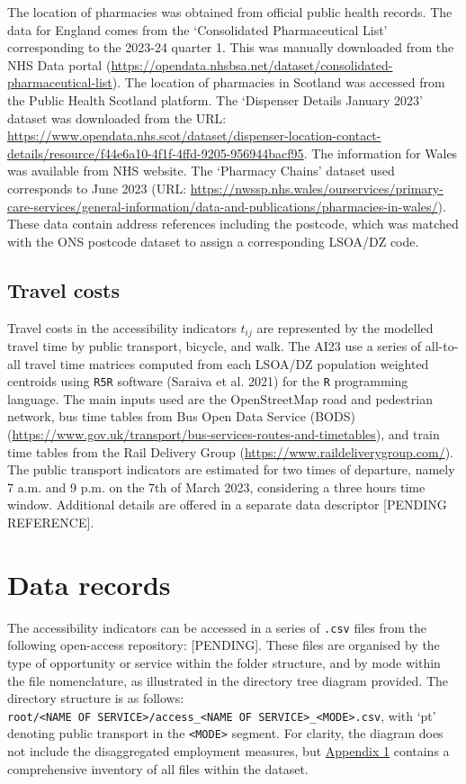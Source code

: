 \documentclass{article}
\begin{document}
The location of pharmacies was obtained from official public health
records. The data for England comes from the `Consolidated
Pharmaceutical List' corresponding to the 2023-24 quarter 1. This was
manually downloaded from the NHS Data portal
(\url{https://opendata.nhsbsa.net/dataset/consolidated-pharmaceutical-list}).
The location of pharmacies in Scotland was accessed from the Public
Health Scotland platform. The `Dispenser Details January 2023' dataset
was downloaded from the URL:
\url{https://www.opendata.nhs.scot/dataset/dispenser-location-contact-details/resource/f44e6a10-4f1f-4ffd-9205-956944bacf95}.
The information for Wales was available from NHS website. The `Pharmacy
Chains' dataset used corresponds to June 2023 (URL:
\url{https://nwssp.nhs.wales/ourservices/primary-care-services/general-information/data-and-publications/pharmacies-in-wales/}).
These data contain address references including the postcode, which was
matched with the ONS postcode dataset to assign a corresponding LSOA/DZ
code.

\hypertarget{travel-costs}{%
\subsection{Travel costs}\label{travel-costs}}

Travel costs in the accessibility indicators \(t_{ij}\) are represented
by the modelled travel time by public transport, bicycle, and walk. The
AI23 use a series of all-to-all travel time matrices computed from each
LSOA/DZ population weighted centroids using \texttt{R5R} software
(Saraiva et al. 2021) for the \texttt{R} programming language. The main
inputs used are the OpenStreetMap road and pedestrian network, bus time
tables from Bus Open Data Service (BODS)
(\url{https://www.gov.uk/transport/bus-services-routes-and-timetables}),
and train time tables from the Rail Delivery Group
(\url{https://www.raildeliverygroup.com/}). The public transport
indicators are estimated for two times of departure, namely 7 a.m. and 9
p.m. on the 7th of March 2023, considering a three hours time window.
Additional details are offered in a separate data descriptor {[}PENDING
REFERENCE{]}.

\hypertarget{data-records}{%
\section{Data records}\label{data-records}}

The accessibility indicators can be accessed in a series of
\texttt{.csv} files from the following open-access repository:
{[}PENDING{]}. These files are organised by the type of opportunity or
service within the folder structure, and by mode within the file
nomenclature, as illustrated in the directory tree diagram provided. The
directory structure is as follows:
\texttt{root/\textless{}NAME\ OF\ SERVICE\textgreater{}/access\_\textless{}NAME\ OF\ SERVICE\textgreater{}\_\textless{}MODE\textgreater{}.csv},
with `pt' denoting public transport in the
\texttt{\textless{}MODE\textgreater{}} segment. For clarity, the diagram
does not include the disaggregated employment measures, but
\protect\hyperlink{inventory}{Appendix 1} contains a comprehensive
inventory of all files within the dataset.
\end{document}
